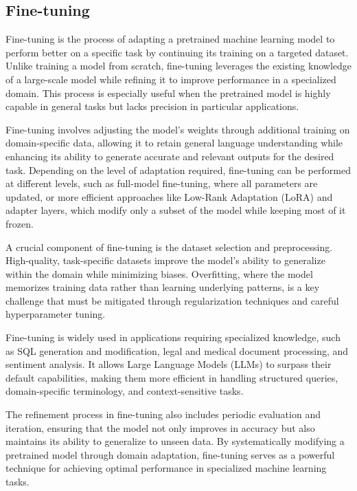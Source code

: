     \subsection{Fine-tuning}
    Fine-tuning is the process of adapting a pretrained machine learning model to perform better on a specific task by continuing its training on a targeted dataset. Unlike training a model from scratch, fine-tuning leverages the existing knowledge of a large-scale model while refining it to improve performance in a specialized domain. This process is especially useful when the pretrained model is highly capable in general tasks but lacks precision in particular applications.

    Fine-tuning involves adjusting the model's weights through additional training on domain-specific data, allowing it to retain general language understanding while enhancing its ability to generate accurate and relevant outputs for the desired task. Depending on the level of adaptation required, fine-tuning can be performed at different levels, such as full-model fine-tuning, where all parameters are updated, or more efficient approaches like Low-Rank Adaptation (LoRA) and adapter layers, which modify only a subset of the model while keeping most of it frozen.

    A crucial component of fine-tuning is the dataset selection and preprocessing. High-quality, task-specific datasets improve the model’s ability to generalize within the domain while minimizing biases. Overfitting, where the model memorizes training data rather than learning underlying patterns, is a key challenge that must be mitigated through regularization techniques and careful hyperparameter tuning.

    Fine-tuning is widely used in applications requiring specialized knowledge, such as SQL generation and modification, legal and medical document processing, and sentiment analysis. It allows Large Language Models (LLMs) to surpass their default capabilities, making them more efficient in handling structured queries, domain-specific terminology, and context-sensitive tasks.

    The refinement process in fine-tuning also includes periodic evaluation and iteration, ensuring that the model not only improves in accuracy but also maintains its ability to generalize to unseen data. By systematically modifying a pretrained model through domain adaptation, fine-tuning serves as a powerful technique for achieving optimal performance in specialized machine learning tasks.
    \cite{levcraigfinetuning}

